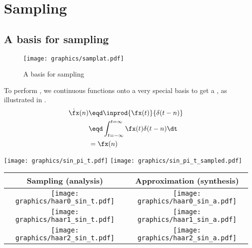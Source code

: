 ﻿%
\chapter{Sampling}
\label{chp:sampling}

\section{A basis for sampling}
\begin{figure}[h]
  \centering
  \texttt{[image: graphics/samplat.pdf]}
\caption{A basis for sampling \label{fig:samplat}}
\end{figure}
  To perform , we  
  continuous functions onto a very special basis
  to get a , as illustrated in .
\begin{align*}
  \dot{\fx}(n)
    &\eqd \inprod{\fx(t)}{\delta(t-n)}
  \\&\eqd \int_{t=-\infty}^{t=\infty} \fx(t)\delta(t-n) \dt
  \\&=    \fx(n)
\end{align*}


\texttt{[image: graphics/sin\_pi\_t.pdf]}
\texttt{[image: graphics/sin\_pi\_t\_sampled.pdf]}


  \begin{tabular}{|c|c|}
    \hline
    Sampling (analysis) & Approximation (synthesis)
    \\\hline\hline
      \texttt{[image: graphics/haar0\_sin\_t.pdf]}
    & \texttt{[image: graphics/haar0\_sin\_a.pdf]}
    \\\hline
      \texttt{[image: graphics/haar1\_sin\_t.pdf]}
    & \texttt{[image: graphics/haar1\_sin\_a.pdf]}
    \\\hline
      \texttt{[image: graphics/haar2\_sin\_t.pdf]}
    & \texttt{[image: graphics/haar2\_sin\_a.pdf]}
    \\\hline
  \end{tabular}

